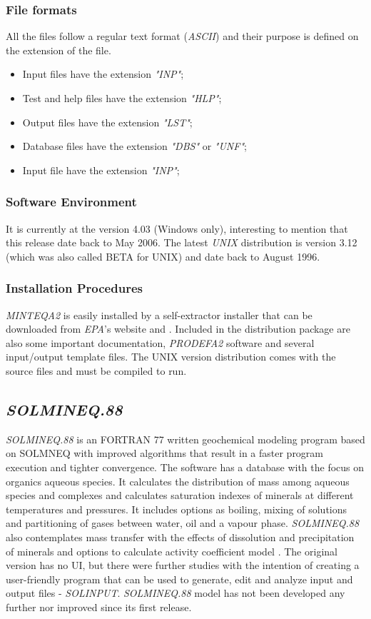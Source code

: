 \documentclass[ppgc,mestrado,English]{iiufrgs}
\begin{document}
\subsubsection{File formats}
All the files follow a regular text format (\emph{ASCII}) and their purpose is defined on the extension of the file. 
\begin{itemize}
\item Input files have the extension \emph{"INP"};
\item Test and help files have the extension \emph{"HLP"};
\item Output files have the extension \emph{"LST"};
\item Database files have the extension \emph{"DBS"} or \emph{"UNF"};
\item Input file have the extension \emph{"INP"};
\end{itemize}

\subsubsection{Software Environment}
It is currently at the version 4.03 (Windows only), interesting to mention that this release date back to May 2006. The latest \emph{UNIX} distribution is version 3.12 (which was also called BETA for UNIX) and date back to August 1996.


\subsubsection{Installation Procedures}
\emph{MINTEQA2} is easily installed by a self-extractor installer that can be downloaded from \emph{EPA}'s website \cite{minteq:website} and \cite{minteq:unix}. Included in the distribution package are also some important documentation, \emph{PRODEFA2} software and several input/output template files.
The UNIX version distribution comes with the source files and must be compiled to run.



\subsection{\emph{SOLMINEQ.88}}
\emph{SOLMINEQ.88} is an FORTRAN 77 written geochemical modeling program based on SOLMNEQ \cite{Kharaka:73} with improved algorithms that result in a faster program execution and tighter convergence. The software has a database with the focus on organics aqueous species. It calculates the distribution of mass among aqueous species and complexes and calculates saturation indexes of minerals at different temperatures and pressures. It includes options as boiling, mixing of solutions and partitioning of gases between water, oil and a vapour phase. \emph{SOLMINEQ.88} also contemplates mass transfer with the effects of dissolution and precipitation of minerals and options to calculate activity coefficient model \cite{Kharaka:88}. The original version has no UI, but there were further studies with the intention of creating a user-friendly program that can be used to generate, edit and analyze input and output files - \emph{SOLINPUT}.
\emph{SOLMINEQ.88} model has not been developed any further nor improved since its first release.
\end{document}
